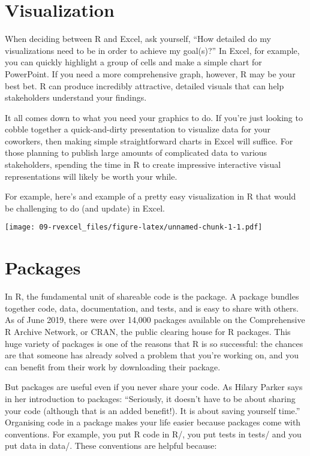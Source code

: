 \documentclass[
]{book}
\begin{document}
\hypertarget{visualization}{%
\section{Visualization}\label{visualization}}

When deciding between R and Excel, ask yourself, ``How detailed do my visualizations need to be in order to achieve my goal(s)?'' In Excel, for example, you can quickly highlight a group of cells and make a simple chart for PowerPoint. If you need a more comprehensive graph, however, R may be your best bet. R can produce incredibly attractive, detailed visuals that can help stakeholders understand your findings.

It all comes down to what you need your graphics to do. If you're just looking to cobble together a quick-and-dirty presentation to visualize data for your coworkers, then making simple straightforward charts in Excel will suffice. For those planning to publish large amounts of complicated data to various stakeholders, spending the time in R to create impressive interactive visual representations will likely be worth your while.

For example, here's and example of a pretty easy visualization in R that would be challenging to do (and update) in Excel.

\texttt{[image: 09-rvexcel\_files/figure-latex/unnamed-chunk-1-1.pdf]}

\hypertarget{packages}{%
\section{Packages}\label{packages}}

In R, the fundamental unit of shareable code is the package. A package bundles together code, data, documentation, and tests, and is easy to share with others. As of June 2019, there were over 14,000 packages available on the Comprehensive R Archive Network, or CRAN, the public clearing house for R packages. This huge variety of packages is one of the reasons that R is so successful: the chances are that someone has already solved a problem that you're working on, and you can benefit from their work by downloading their package.

But packages are useful even if you never share your code. As Hilary Parker says in her introduction to packages: ``Seriously, it doesn't have to be about sharing your code (although that is an added benefit!). It is about saving yourself time.'' Organising code in a package makes your life easier because packages come with conventions. For example, you put R code in R/, you put tests in tests/ and you put data in data/. These conventions are helpful because:
\end{document}
